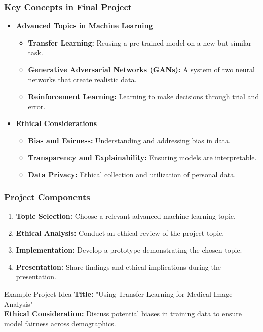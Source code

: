 \documentclass[aspectratio=169]{beamer}
\begin{document}
\begin{frame}[fragile]
    \frametitle{Key Concepts in Final Project}
    \begin{itemize}
        \item \textbf{Advanced Topics in Machine Learning}
            \begin{itemize}
                \item \textbf{Transfer Learning:} Reusing a pre-trained model on a new but similar task. 
                \item \textbf{Generative Adversarial Networks (GANs):} A system of two neural networks that create realistic data.
                \item \textbf{Reinforcement Learning:} Learning to make decisions through trial and error.
            \end{itemize}
        
        \item \textbf{Ethical Considerations}
            \begin{itemize}
                \item \textbf{Bias and Fairness:} Understanding and addressing bias in data.
                \item \textbf{Transparency and Explainability:} Ensuring models are interpretable.
                \item \textbf{Data Privacy:} Ethical collection and utilization of personal data.
            \end{itemize}
    \end{itemize}
\end{frame}

\begin{frame}[fragile]
    \frametitle{Project Components}
    \begin{enumerate}
        \item \textbf{Topic Selection:} Choose a relevant advanced machine learning topic.
        \item \textbf{Ethical Analysis:} Conduct an ethical review of the project topic.
        \item \textbf{Implementation:} Develop a prototype demonstrating the chosen topic.
        \item \textbf{Presentation:} Share findings and ethical implications during the presentation.
    \end{enumerate}

    \begin{block}{Example Project Idea}
        \textbf{Title:} "Using Transfer Learning for Medical Image Analysis"\\
        \textbf{Ethical Consideration:} Discuss potential biases in training data to ensure model fairness across demographics.
    \end{block}
\end{frame}
\end{document}

